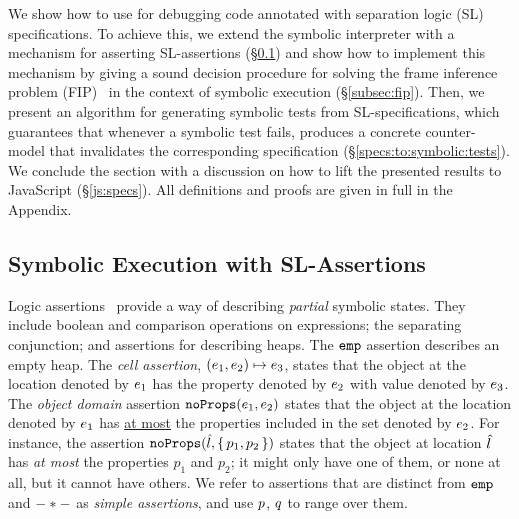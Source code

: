 


We show how to use \cosette for debugging \jsil code annotated with separation logic (SL) specifications.
To achieve this, we extend the 
 \jsil symbolic interpreter with a mechanism for asserting
SL-assertions (\S\ref{subsec:sep:assertions}) and show how to 
implement this mechanism by giving a sound decision procedure 
for solving the frame inference problem (FIP)~\cite{berdine:aplas:2005}
in the context of symbolic execution (\S\ref{subsec:fip}).
%
%
Then, we present an algorithm  
for generating symbolic tests from SL-specifications, which guarantees 
that whenever a symbolic test fails, \cosette produces a concrete 
counter-model that invalidates the corresponding specification (\S\ref{specs:to:symbolic:tests}). 
We conclude the section with a discussion on how to lift the presented results to JavaScript (\S\ref{js:specs}).
All definitions and proofs are given in full in the Appendix.

\vspace{-5pt}
\subsection{Symbolic Execution with SL-Assertions}\label{subsec:sep:assertions}

\jsil Logic assertions~\cite{javert} provide a way of describing \emph{partial} symbolic states.
They include boolean and comparison operations on \jsil expressions; the separating conjunction; 
and assertions for describing heaps. The $\texttt{emp}$ assertion describes 
an empty heap. The \emph{cell assertion}, $(e_1,e_2) \mapsto e_3$,  states that the object 
at the location denoted by $e_1$ has the property denoted by $e_2$ with value 
denoted by $e_3$. The \emph{object domain} assertion $\texttt{noProps}(e_1, e_2)$ states that the object at 
the location denoted by $e_1$ has \underline{at most} the properties included in the
set denoted by $e_2$. For instance, the assertion $\texttt{noProps}(\hat{l}, \{ \, p_1, p_2 \, \})$ 
states that the object at location $\hat{l}$ has \emph{at most} the properties $p_1$ and $p_2$; 
it might only have one of them, or none at all, but it cannot have others.
We refer to assertions that are distinct from $\texttt{emp}$ and $- \mathbin{*} -$ as \emph{simple assertions}, and use $p$, $q$ 
to range over them.

